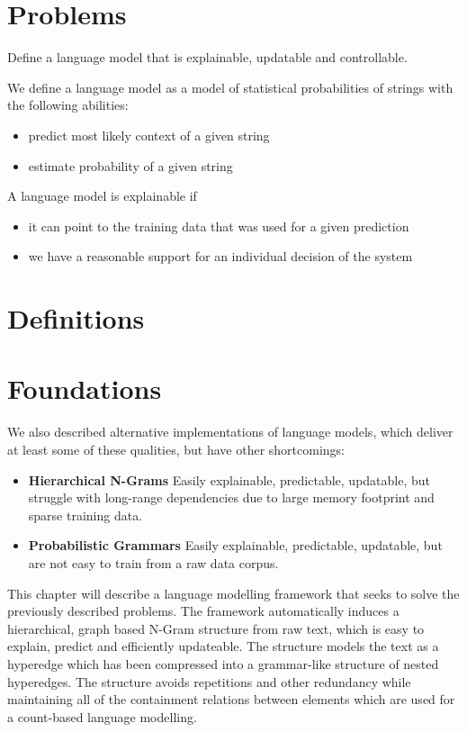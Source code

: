 
\section{Problems}

Define a language model that is explainable, updatable and controllable.

We define a language model as a model of statistical probabilities of strings with the following abilities: 
\begin{itemize}
    \item predict most likely context of a given string
    \item estimate probability of a given string
\end{itemize}
A language model is explainable if 
\begin{itemize}
    \item it can point to the training data that was used for a given prediction
    \item we have a reasonable support for an individual decision of the system
\end{itemize}

\section{Definitions}

\section{Foundations}


We also described alternative implementations of language models, which deliver at least some of these qualities, but have other shortcomings:
\begin{itemize}
\item \textbf{Hierarchical N-Grams} Easily explainable, predictable, updatable, but struggle with long-range dependencies due to large memory footprint and sparse training data.
\item \textbf{Probabilistic Grammars} Easily explainable, predictable, updatable, but are not easy to train from a raw data corpus.
\end{itemize}

This chapter will describe a language modelling framework that seeks to solve the previously described problems. The framework automatically induces a hierarchical, graph based N-Gram structure from raw text, which is easy to explain, predict and efficiently updateable. The structure models the text as a hyperedge which has been compressed into a grammar-like structure of nested hyperedges. The structure avoids repetitions and other redundancy while maintaining all of the containment relations between elements which are used for a count-based language modelling.


